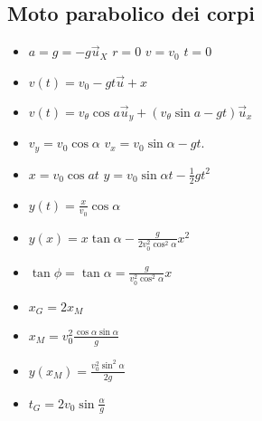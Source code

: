 	\subsection{Moto parabolico dei corpi}
	\begin{itemize}
		\item $a = g = -g\overrightarrow{u}_X$ $r = 0$ $v = v_0$ $t = 0$
		\item $v(t) = v_0-gt\overrightarrow{u}+x$
		\item $v(t) = v_\theta\cos a\overrightarrow{u}_y + (v_\theta \sin a -gt)\overrightarrow{u}_x$
		\item $v_y = v_0\cos\alpha$ $v_x = v_0\sin\alpha -gt$.
		\item $x = v_0\cos at$ $y = v_0\sin\alpha t-\frac{1}{2}gt^2$
		\item $y(t)=\frac{x}{v_0}\cos\alpha$
		\item $y(x) = x\tan\alpha-\frac{g}{2v_0^2\cos^2\alpha}x^2$
		\item $\tan\phi =\tan\alpha=\frac{g}{v_0^2\cos^2\alpha}x$
		\item $x_G = 2x_M$
		\item $x_M = v_0^2\frac{\cos\alpha\sin\alpha}{g}$
		\item $y(x_M)=\frac{v_0^2\sin^2\alpha}{2g}$
		\item $t_G = 2v_0\sin\frac{\alpha}{g}$
	\end{itemize}
